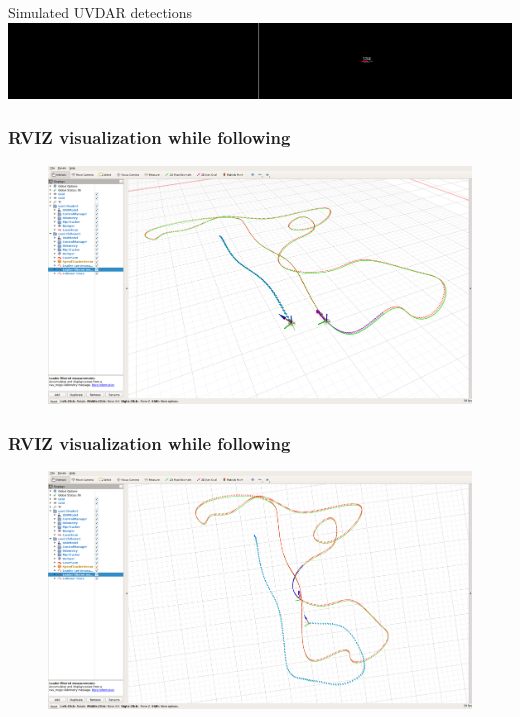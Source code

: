 \documentclass[aspectratio=1610]{beamer}
\begin{document}
\begin{frame}
\begin{columns}[c]
    \end{columns}

    \begin{block}{Simulated UVDAR detections}
      \includegraphics[width=1.0\textwidth]{./fig/uvdar_task/uvdar.png}
    \end{block}

  \end{frame}


  \begin{frame}
    \frametitle{RVIZ visualization while following}

    \begin{figure}
      \includegraphics[width=1.0\textwidth]{fig/uvdar_task/following1.png}
    \end{figure}

  \end{frame}

  \begin{frame}
    \frametitle{RVIZ visualization while following}

    \begin{figure}
      \includegraphics[width=1.0\textwidth]{fig/uvdar_task/following_top_down.png}
    \end{figure}

  \end{frame}
\end{document}
